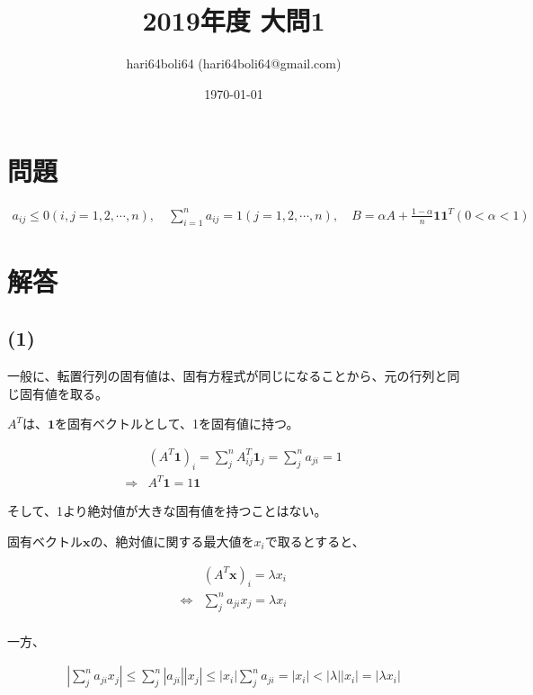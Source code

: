 \documentclass[a4paper, 10pt, dvipdfmx]{jlreq}
\begin{document}
\title{2019年度 大問1}
\author{hari64boli64 (hari64boli64@gmail.com)}
\date{\today}
\maketitle


\section{問題}

\begin{align*}
    a_{ij} \leq 0 (i,j = 1,2,\cdots,n), \quad \sum_{i=1}^{n}a_{ij}=1 (j=1,2,\cdots,n),  \quad B=\alpha A+\frac{1-\alpha}{n}\bm{1}\bm{1}^T (0<\alpha<1)
\end{align*}

\section{解答}

\subsection*{(1)}

一般に、転置行列の固有値は、固有方程式が同じになることから、元の行列と同じ固有値を取る。

$A^T$は、$\bm{1}$を固有ベクトルとして、1を固有値に持つ。

\begin{align*}
                & (A^T\bm{1})_i=\sum_{j}^n A^T_{ij}\bm{1}_j=\sum_{j}^na_{ji}=1 \\
    \Rightarrow & A^T\bm{1}=1\bm{1}
\end{align*}

そして、1より絶対値が大きな固有値を持つことはない。

固有ベクトル$\bm{x}$の、絶対値に関する最大値を$x_i$で取るとすると、

\begin{align*}
                    & (A^T\bm{x})_i =\lambda x_i        \\
    \Leftrightarrow & \sum_{j}^n a_{ji}x_j =\lambda x_i \\
\end{align*}

一方、

\begin{align*}
    \left|\sum_{j}^n a_{ji}x_j\right|\leq \sum_{j}^n |a_{ji}||x_j| \leq |x_i|\sum_{j}^n a_{ji} = |x_i| < |\lambda||x_i|=|\lambda x_i|
\end{align*}
\end{document}
